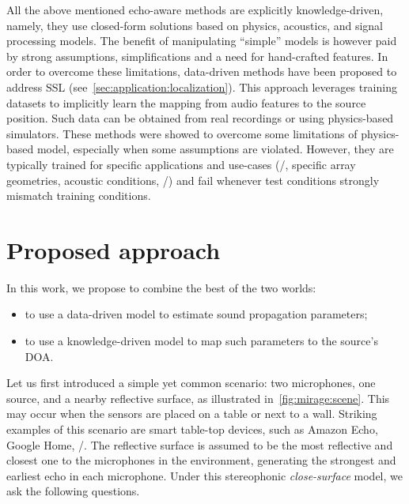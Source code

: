 \mynewline
All the above mentioned echo-aware methods are explicitly knowledge-driven, namely, they use closed-form solutions based on physics, acoustics, and signal processing models.
The benefit of manipulating ``simple'' models is however paid by strong assumptions, simplifications and a need for hand-crafted features.
In order to overcome these limitations, data-driven methods have been proposed to address \ac{SSL} (see~\cref{sec:application:localization}).
This approach leverages  training datasets to implicitly learn the mapping from audio features to the source position.
Such data can be obtained from real recordings or using physics-based simulators.
These methods were showed to overcome some limitations of physics-based model, especially when some assumptions are violated.
However, they are typically trained for specific applications and use-cases (\eg/, specific array geometries, acoustic conditions, \etc/) and fail whenever test conditions strongly mismatch training conditions.

\section{Proposed approach}
In this work, we propose to combine the best of the two worlds:
\begin{itemize}
    \item to use a data-driven model to estimate sound propagation parameters;
    \item to use a knowledge-driven model to map such parameters to the source's \ac{DOA}.
\end{itemize}
Let us first introduced a simple yet common scenario:
two microphones, one source, and a nearby reflective surface, as illustrated in~\cref{fig:mirage:scene}.
This may occur when the sensors are placed on a table or next to a wall.
Striking examples of this scenario are smart table-top devices, such as Amazon Echo, Google Home, \etc/.
The reflective surface is assumed to be the most reflective and closest one to the microphones in the environment, generating the strongest and earliest echo in each microphone.
Under this stereophonic \textit{close-surface} model, we ask the following questions.

